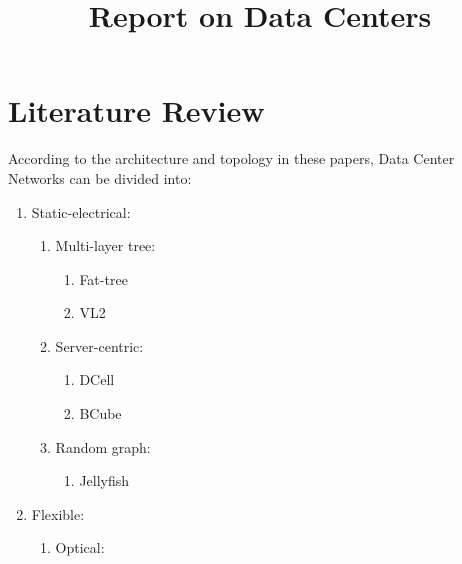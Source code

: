 \documentclass[journal,onecolumn,11pt]{IEEEtran}
\title{Report on Data Centers}
\author{\IEEEauthorblockN{Yongsen MA}
}
\begin{document}
\maketitle%

\section{Literature Review}

According to the architecture and topology in these papers, Data Center Networks can be divided into:
\begin{enumerate}
  \item Static-electrical:
  \begin{enumerate}
    \item Multi-layer tree:
        \begin{enumerate}
          \item Fat-tree \cite{Al-Fares:2008:SCD:1402958.1402967}
          \item VL2 \cite{Greenberg:2009:VSF:1592568.1592576}
        \end{enumerate}
    \item Server-centric:
        \begin{enumerate}
          \item DCell \cite{Guo:2008:DSF:1402958.1402968}
          \item BCube \cite{Guo:2009:BHP:1592568.1592577}
        \end{enumerate}
    \item Random graph:
        \begin{enumerate}
        \item Jellyfish \cite{singla2012jellyfish}
        \end{enumerate}
  \end{enumerate}
  \item Flexible:
  \begin{enumerate}
    \item Optical:
    \begin{enumerate}

\end{enumerate}
\end{enumerate}
\end{enumerate}
\end{document}
